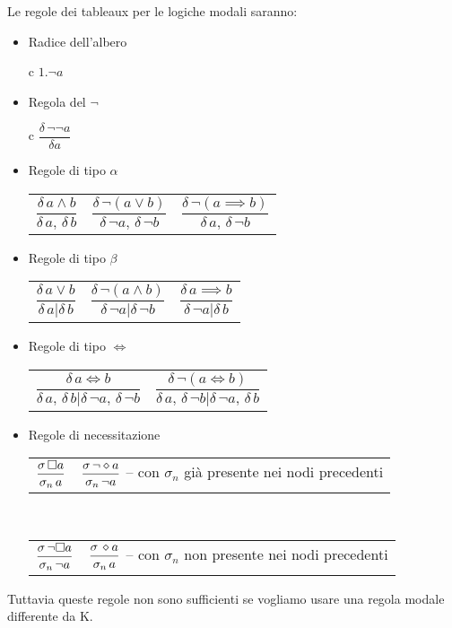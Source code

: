 Le regole dei tableaux per le logiche modali saranno:
\begin{itemize}
\item Radice dell'albero\\
\def\arraystretch{3} 
\tabcolsep=10.8mm  \begin{tabular}{{c}} $1.\neg a$\end{tabular}
\item Regola del $\neg$\\
\tabcolsep=10.8mm  \begin{tabular}{{c}}  $\dfrac{\delta\,\neg\neg a}{\delta a}$
\end{tabular}
\item Regole di tipo $\alpha$\\
\tabcolsep=10.8mm  \begin{tabular}{*3{c}} $\dfrac{\delta\, a\wedge b}{\delta\, a,\,\delta\, b}$&
$\dfrac{\delta\,\neg(a\vee b)}{\delta\,\neg a,\,\delta\,\neg b}$
& $\dfrac{\delta\,\neg(a\implies b)}{\delta\, a,\,\delta\,\neg b}$
\end{tabular}
\item Regole di tipo $\beta$\\
\tabcolsep=10.8mm  \begin{tabular}{*3{c}} $\dfrac{\delta\, a\vee b}{\delta\, a|\delta\, b}$
&$\dfrac{\delta\,\neg(a\wedge b)}{\delta\,\neg a|\delta\,\neg b}$
&$\dfrac{\delta\, a\implies b}{\delta\,\neg a|\delta\, b}$\end{tabular}
\item Regole di tipo $\iff$\\
\tabcolsep=10.8mm  \begin{tabular}{*2{c}} $\dfrac{\delta\, a\iff b}{\delta\, a,\,\delta\, b|\delta\,\neg a,\,\delta\,\neg b}$
&$\dfrac{\delta\,\neg(a\iff b)}{\delta\, a,\,\delta\,\neg b|\delta\,\neg a,\,\delta\, b}$
\end{tabular}
\item Regole di necessitazione\\
\tabcolsep=10.8mm  \begin{tabular}{*2{c}} $\dfrac{\sigma\,\square a}{\sigma_{n}\, a}$
& $\dfrac{\sigma\,\neg\diamond a}{\sigma_{n}\,\neg a}$ -- con $\sigma_{n}$
già presente nei nodi precedenti \end{tabular}\\
\tabcolsep=10.8mm  \begin{tabular}{*2{c}} $\dfrac{\sigma\,\neg\square a}{\sigma_{n}\,\neg a}$
&$\dfrac{\sigma\,\diamond a}{\sigma_{n}\, a}$ -- con $\sigma_{n}$ non
presente nei nodi precedenti\end{tabular}
\end{itemize}
Tuttavia queste regole non sono sufficienti se vogliamo usare una
regola modale differente da K.

